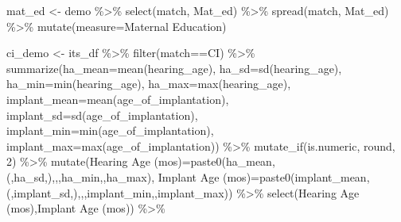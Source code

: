 \documentclass[
]{article}
\newenvironment{Shaded}{\begin{snugshade}}{\end{snugshade}}
\newcommand{\AttributeTok}[1]{\textcolor[rgb]{0.77,0.63,0.00}{#1}}
\newcommand{\DecValTok}[1]{\textcolor[rgb]{0.00,0.00,0.81}{#1}}
\newcommand{\FunctionTok}[1]{\textcolor[rgb]{0.00,0.00,0.00}{#1}}
\newcommand{\NormalTok}[1]{#1}
\newcommand{\OtherTok}[1]{\textcolor[rgb]{0.56,0.35,0.01}{#1}}
\newcommand{\SpecialCharTok}[1]{\textcolor[rgb]{0.00,0.00,0.00}{#1}}
\newcommand{\StringTok}[1]{\textcolor[rgb]{0.31,0.60,0.02}{#1}}
\begin{document}
\begin{Shaded}
\begin{Highlighting}[]
\NormalTok{mat\_ed }\OtherTok{\textless{}{-}}\NormalTok{ demo }\SpecialCharTok{\%\textgreater{}\%}
  \FunctionTok{select}\NormalTok{(match, Mat\_ed) }\SpecialCharTok{\%\textgreater{}\%}
  \FunctionTok{spread}\NormalTok{(match, Mat\_ed) }\SpecialCharTok{\%\textgreater{}\%}
  \FunctionTok{mutate}\NormalTok{(}\AttributeTok{measure=}\StringTok{\textquotesingle{}Maternal Education\textquotesingle{}}\NormalTok{)}

\NormalTok{ci\_demo }\OtherTok{\textless{}{-}}\NormalTok{ its\_df }\SpecialCharTok{\%\textgreater{}\%}
  \FunctionTok{filter}\NormalTok{(match}\SpecialCharTok{==}\StringTok{\textquotesingle{}CI\textquotesingle{}}\NormalTok{) }\SpecialCharTok{\%\textgreater{}\%}
  \FunctionTok{summarize}\NormalTok{(}\AttributeTok{ha\_mean=}\FunctionTok{mean}\NormalTok{(hearing\_age),}
            \AttributeTok{ha\_sd=}\FunctionTok{sd}\NormalTok{(hearing\_age),}
            \AttributeTok{ha\_min=}\FunctionTok{min}\NormalTok{(hearing\_age),}
            \AttributeTok{ha\_max=}\FunctionTok{max}\NormalTok{(hearing\_age),}
            \AttributeTok{implant\_mean=}\FunctionTok{mean}\NormalTok{(age\_of\_implantation),}
            \AttributeTok{implant\_sd=}\FunctionTok{sd}\NormalTok{(age\_of\_implantation),}
            \AttributeTok{implant\_min=}\FunctionTok{min}\NormalTok{(age\_of\_implantation),}
            \AttributeTok{implant\_max=}\FunctionTok{max}\NormalTok{(age\_of\_implantation)) }\SpecialCharTok{\%\textgreater{}\%}
  \FunctionTok{mutate\_if}\NormalTok{(is.numeric, round, }\DecValTok{2}\NormalTok{) }\SpecialCharTok{\%\textgreater{}\%}
  \FunctionTok{mutate}\NormalTok{(}\StringTok{\textasciigrave{}}\AttributeTok{Hearing Age (mos)}\StringTok{\textasciigrave{}}\OtherTok{=}\FunctionTok{paste0}\NormalTok{(ha\_mean,}\StringTok{\textquotesingle{}(\textquotesingle{}}\NormalTok{,ha\_sd,}\StringTok{\textquotesingle{})\textquotesingle{}}\NormalTok{,}\StringTok{\textquotesingle{},\textquotesingle{}}\NormalTok{,ha\_min,}\StringTok{\textquotesingle{}{-}\textquotesingle{}}\NormalTok{,ha\_max),}
         \StringTok{\textasciigrave{}}\AttributeTok{Implant Age (mos)}\StringTok{\textasciigrave{}}\OtherTok{=}\FunctionTok{paste0}\NormalTok{(implant\_mean,}\StringTok{\textquotesingle{}(\textquotesingle{}}\NormalTok{,implant\_sd,}\StringTok{\textquotesingle{})\textquotesingle{}}\NormalTok{,}\StringTok{\textquotesingle{},\textquotesingle{}}\NormalTok{,implant\_min,}\StringTok{\textquotesingle{}{-}\textquotesingle{}}\NormalTok{,implant\_max)) }\SpecialCharTok{\%\textgreater{}\%}
  \FunctionTok{select}\NormalTok{(}\StringTok{\textasciigrave{}}\AttributeTok{Hearing Age (mos)}\StringTok{\textasciigrave{}}\NormalTok{,}\StringTok{\textasciigrave{}}\AttributeTok{Implant Age (mos)}\StringTok{\textasciigrave{}}\NormalTok{) }\SpecialCharTok{\%\textgreater{}\%}

\end{Highlighting}
\end{Shaded}
\end{document}
